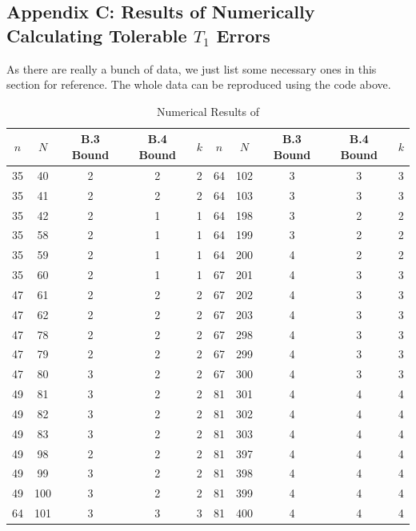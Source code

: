 \documentclass[12pt]{article}
\begin{document}
\subsection{Appendix C: Results of Numerically Calculating Tolerable $T_1$ Errors}
\label{toleranceres}

As there are really a bunch of data, we just list some necessary ones in this section for reference. The whole data can be reproduced using the code above. 

\begin{table}[htbp]
    \centering
    \begin{tabular}{ccccc|ccccc}
        \toprule
        $n$ & $N$ & B.3 Bound & B.4 Bound & $k$ & $n$ & $N$ & B.3 Bound & B.4 Bound & $k$ \\
        \midrule
        35 & 40 & 2 & 2 & 2 & 64 & 102 & 3 & 3 & 3 \\
        35 & 41 & 2 & 2 & 2 & 64 & 103 & 3 & 3 & 3 \\
        35 & 42 & 2 & 1 & 1 & 64 & 198 & 3 & 2 & 2 \\
        35 & 58 & 2 & 1 & 1 & 64 & 199 & 3 & 2 & 2 \\
        35 & 59 & 2 & 1 & 1 & 64 & 200 & 4 & 2 & 2 \\
        35 & 60 & 2 & 1 & 1 & 67 & 201 & 4 & 3 & 3 \\
        47 & 61 & 2 & 2 & 2 & 67 & 202 & 4 & 3 & 3 \\
        47 & 62 & 2 & 2 & 2 & 67 & 203 & 4 & 3 & 3 \\
        47 & 78 & 2 & 2 & 2 & 67 & 298 & 4 & 3 & 3 \\
        47 & 79 & 2 & 2 & 2 & 67 & 299 & 4 & 3 & 3 \\
        47 & 80 & 3 & 2 & 2 & 67 & 300 & 4 & 3 & 3 \\
        49 & 81 & 3 & 2 & 2 & 81 & 301 & 4 & 4 & 4 \\
        49 & 82 & 3 & 2 & 2 & 81 & 302 & 4 & 4 & 4 \\
        49 & 83 & 3 & 2 & 2 & 81 & 303 & 4 & 4 & 4 \\
        49 & 98 & 2 & 2 & 2 & 81 & 397 & 4 & 4 & 4 \\
        49 & 99 & 3 & 2 & 2 & 81 & 398 & 4 & 4 & 4 \\
        49 & 100 & 3 & 2 & 2 & 81 & 399 & 4 & 4 & 4 \\
        64 & 101 & 3 & 3 & 3 & 81 & 400 & 4 & 4 & 4 \\			
        \bottomrule
    \end{tabular}
    \caption{Numerical Results of \cite{OIML2016}}
\end{table}
\end{document}
